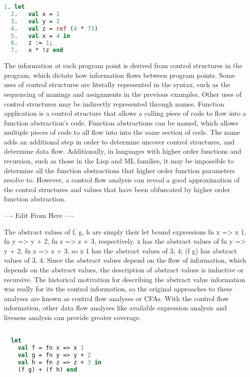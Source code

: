 \documentclass{article}
\begin{document}
\begin{lstlisting}[language=ML, escapechar=\%]
  1. let 
  2.   val x = 1  
  3.   val y = 2
  4.   val z = ref (4 * 73)
  5.   val x = 4 in 
  6.   z := 1; 
  7.   x * !z end
  \end{lstlisting}

The information at each program point is derived from control structures in the program, which
dictate how information flows between program points. Some uses of control structures are
literally represented in the syntax, such as the sequencing of namings and assignments in the
previous examples. Other uses of control structures may be indirectly represented through
names. Function application is a control structure that allows a calling piece of code to
flow into a function abstraction's code.  Function abstractions can be named, which allows
multiple pieces of code to all flow into into the same section of code. The name adds an
additional step in order to determine uncover control structures, and determine data flow.
Additionally, in languages with higher order functions and recursion, such as those in the Lisp
and ML families, it may be impossible to determine all the function abstractions that higher
order function parameters resolve to. However, a control flow analysis can reveal a good
approximation of the control structures and values that have been obfuscated by higher order
function abstraction. 


---- Edit From Here ----


The abstract values of f, g, h are simply their let bound expressions {fn x => x 1},
{fn y => y + 2},  {fn z => z + 3}, respectively.  x has the abstract values of
{fn y => y + 2, fn z => z + 3}, so x 1 has the abstract values of {3, 4}; (f g) has abstract
values of {3, 4}.  Since the abstract values depend on the flow of information, which depends
on the abstract values, the description of abstract values is inductive or recursive.  The
historical motivation for describing the abstract value information was really for its the
control information, so the original approaches to these analyses are known as control flow
analyses or CFAs.  With the control flow information, other data flow analyses like available
expression analysis and liveness analysis can provide greater coverage.

\begin{lstlisting}[language=ML, escapechar=\%]

  let 
    val f = fn x => x 1
    val g = fn y => y + 2
    val h = fn z => z + 3 in 
    (f g) + (f h) end

\end{lstlisting}
\end{document}
